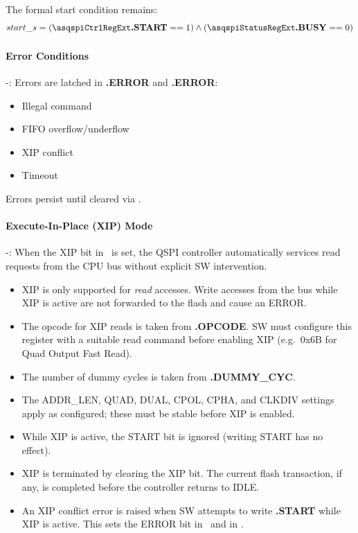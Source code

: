 The formal start condition remains:
\[
  start\_s = (\asqspiCtrlRegExt\textbf{.START} == 1) \land (\asqspiStatusRegExt\textbf{.BUSY} == 0)
\]


\paragraph{Error Conditions} -:
Errors are latched in \asqspiStatusRegExt\textbf{.ERROR} and \asqspiRISRegExt\textbf{.ERROR}:
\begin{itemize}
  \item Illegal command
  \item FIFO overflow/underflow
  \item XIP conflict
  \item Timeout
\end{itemize}
Errors persist until cleared via \asqspiICRRegExt.

\paragraph{Execute-In-Place (XIP) Mode} -:
When the XIP bit in \asqspiCtrlRegExt\ is set, the QSPI controller automatically
services read requests from the CPU bus without explicit SW intervention.

\begin{itemize}
  \item XIP is only supported for \emph{read} accesses. Write accesses from the
    bus while XIP is active are not forwarded to the flash and cause an ERROR.
  \item The opcode for XIP reads is taken from \asqspiCmdRegExt\textbf{.OPCODE}.
    SW must configure this register with a suitable read command before
    enabling XIP (e.g.\ 0x6B for Quad Output Fast Read).
  \item The number of dummy cycles is taken from \asqspiDummyRegExt\textbf{.DUMMY\_CYC}.
  \item The ADDR\_LEN, QUAD, DUAL, CPOL, CPHA, and CLKDIV settings apply as
    configured; these must be stable before XIP is enabled.
  \item While XIP is active, the START bit is ignored (writing START has no effect).
  \item XIP is terminated by clearing the XIP bit. The current flash transaction,
    if any, is completed before the controller returns to IDLE.
  \item An XIP conflict error is raised when SW attempts to write
    \asqspiCtrlRegExt\textbf{.START} while XIP is active. This sets the
    ERROR bit in \asqspiStatusRegExt\ and in \asqspiRISRegExt.
\end{itemize}

